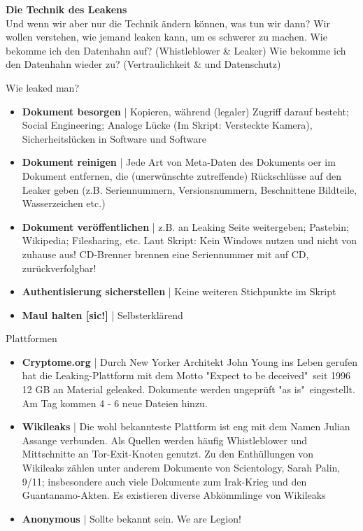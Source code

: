 \documentclass{article} %
\begin{document}
\textbf{Die Technik des Leakens}\\
Und wenn wir aber nur die Technik ändern können, was tun wir dann?
Wir wollen verstehen, wie jemand leaken kann, um es schwerer zu machen.
Wie bekomme ich den Datenhahn auf? (Whistleblower \& Leaker)
Wie bekomme ich den Datenhahn wieder zu? (Vertraulichkeit \& und Datenschutz)


Wie leaked man?
\begin{itemize}
	\item \textbf{Dokument besorgen} | Kopieren, während (legaler) Zugriff darauf besteht; Social Engineering; Analoge Lücke (Im Skript: Versteckte Kamera), Sicherheitslücken in Software und Software
	\item \textbf{Dokument reinigen} | Jede Art von Meta-Daten des Dokuments oer im Dokument entfernen, die (unerwünschte zutreffende) Rückschlüsse auf den Leaker geben (z.B. Seriennummern, Versionsnummern, Beschnittene Bildteile, Wasserzeichen etc.)
	\item \textbf{Dokument veröffentlichen} | z.B. an Leaking Seite weitergeben; Pastebin; Wikipedia; Filesharing, etc. Laut Skript: Kein Windows nutzen und nicht von zuhause aus! CD-Brenner brennen eine Seriennummer mit auf CD, zurückverfolgbar!
	\item \textbf{Authentisierung sicherstellen} | Keine weiteren Stichpunkte im Skript
	\item \textbf{Maul halten [sic!]} | Selbsterklärend
\end{itemize}

Plattformen
\begin{itemize}
	\item \textbf{Cryptome.org} | Durch New Yorker Architekt John Young ins Leben gerufen hat die Leaking-Plattform mit dem Motto "Expect to be deceived"\ seit 1996 12 GB an Material geleaked. Dokumente werden ungeprüft "as is"\ eingestellt. Am Tag kommen 4 - 6 neue Dateien hinzu.
	\item \textbf{Wikileaks} | Die wohl bekannteste Plattform ist eng mit dem Namen Julian Assange verbunden. Als Quellen werden häufig Whistleblower und Mittschnitte an Tor-Exit-Knoten genutzt. Zu den Enthüllungen von Wikileaks zählen unter anderem Dokumente von Scientology, Sarah Palin, 9/11; insbesondere auch viele Dokumente zum Irak-Krieg und den Guantanamo-Akten. Es existieren diverse Abkömmlinge von Wikileaks
	\item \textbf{Anonymous} | Sollte bekannt sein. We are Legion!
\end{itemize}
\end{document}
